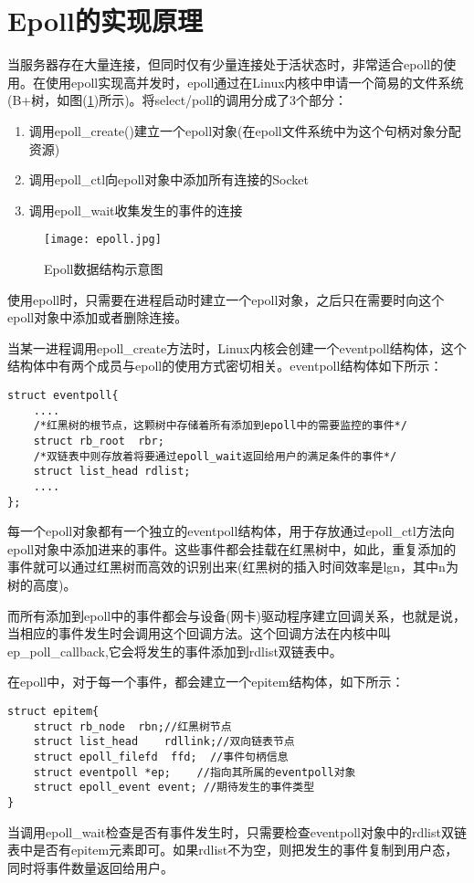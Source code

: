 \documentclass[bachelor]{thesis-uestc}
\begin{document}
\section{Epoll的实现原理}

当服务器存在大量连接，但同时仅有少量连接处于活状态时，非常适合epoll的使用。在使用epoll实现高并发时，epoll通过在Linux内核中申请一个简易的文件系统(B+树，如图(\ref{epoll})所示)。将select/poll的调用分成了3个部分：
\begin{enumerate}
	\item 调用epoll\_create()建立一个epoll对象(在epoll文件系统中为这个句柄对象分配资源)
	\item 调用epoll\_ctl向epoll对象中添加所有连接的Socket
	\item 调用epoll\_wait收集发生的事件的连接
\end{enumerate}

\begin{figure}[h]
\texttt{[image: epoll.jpg]}
\caption{Epoll数据结构示意图}
\label{epoll} 
\end{figure}

使用epoll时，只需要在进程启动时建立一个epoll对象，之后只在需要时向这个epoll对象中添加或者删除连接。

当某一进程调用epoll\_create方法时，Linux内核会创建一个eventpoll结构体，这个结构体中有两个成员与epoll的使用方式密切相关。eventpoll结构体如下所示：

\begin{lstlisting}
struct eventpoll{
    ....
    /*红黑树的根节点，这颗树中存储着所有添加到epoll中的需要监控的事件*/
    struct rb_root  rbr;
    /*双链表中则存放着将要通过epoll_wait返回给用户的满足条件的事件*/
    struct list_head rdlist;
    ....
};	
\end{lstlisting}

每一个epoll对象都有一个独立的eventpoll结构体，用于存放通过epoll\_ctl方法向epoll对象中添加进来的事件。这些事件都会挂载在红黑树中，如此，重复添加的事件就可以通过红黑树而高效的识别出来(红黑树的插入时间效率是lgn，其中n为树的高度)。

而所有添加到epoll中的事件都会与设备(网卡)驱动程序建立回调关系，也就是说，当相应的事件发生时会调用这个回调方法。这个回调方法在内核中叫ep\_poll\_callback,它会将发生的事件添加到rdlist双链表中。

在epoll中，对于每一个事件，都会建立一个epitem结构体，如下所示：

\begin{lstlisting}
struct epitem{
    struct rb_node  rbn;//红黑树节点
    struct list_head    rdllink;//双向链表节点
    struct epoll_filefd  ffd;  //事件句柄信息
    struct eventpoll *ep;    //指向其所属的eventpoll对象
    struct epoll_event event; //期待发生的事件类型
}
\end{lstlisting}
当调用epoll\_wait检查是否有事件发生时，只需要检查eventpoll对象中的rdlist双链表中是否有epitem元素即可。如果rdlist不为空，则把发生的事件复制到用户态，同时将事件数量返回给用户。
\end{document}
